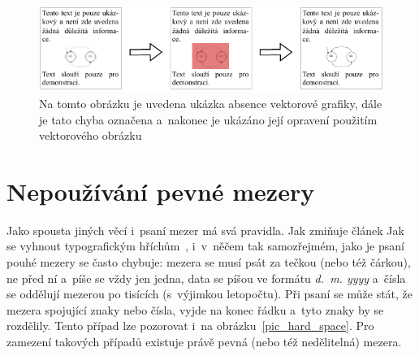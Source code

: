 \begin{figure}[H]
    \centering
    \includegraphics[width=\linewidth]{obrazky-figures/vector_graphics_example.pdf}
    \caption{
        Na tomto obrázku je uvedena ukázka absence vektorové grafiky, dále je
        tato chyba označena a~nakonec je ukázáno její opravení použitím 
        vektorového obrázku
    }
    \label{pic_vector_graphics}
\end{figure}


\section{Nepoužívání pevné mezery}
Jako spousta jiných věcí i~psaní mezer má svá pravidla. Jak zmiňuje
článek Jak se vyhnout typografickým hříchům~\cite{Ctenar_12_2015}, i~v~něčem
tak samozřejmém, jako je psaní pouhé
mezery se často chybuje: mezera se musí psát za tečkou (nebo též čárkou), ne před
ní a~píše se vždy jen jedna, data se píšou ve formátu \emph{d.~m. yyyy}
a~čísla se oddělují mezerou po tisících (s~výjimkou letopočtu). Při psaní se může
stát, že mezera spojující znaky nebo čísla, vyjde na konec řádku a~tyto znaky
by se rozdělily. Tento případ lze pozorovat i~na obrázku~\ref{pic_hard_space}.
Pro zamezení takových případů existuje právě pevná (nebo též nedělitelná)
mezera.

